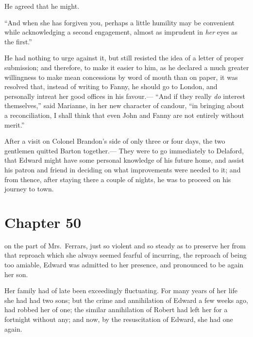 He agreed that he might.

``And when she has forgiven you, perhaps a little humility
may be convenient while acknowledging a second engagement,
almost as imprudent in \emph{her} eyes as the first.''

He had nothing to urge against it, but still
resisted the idea of a letter of proper submission;
and therefore, to make it easier to him, as he declared
a much greater willingness to make mean concessions
by word of mouth than on paper, it was resolved that,
instead of writing to Fanny, he should go to London,
and personally intreat her good offices in his favour.---%
``And if they really \emph{do} interest themselves,'' said Marianne,
in her new character of candour, ``in bringing about
a reconciliation, I shall think that even John and Fanny
are not entirely without merit.''

After a visit on Colonel Brandon's side of only three
or four days, the two gentlemen quitted Barton together.---%
They were to go immediately to Delaford, that Edward
might have some personal knowledge of his future home,
and assist his patron and friend in deciding on what
improvements were needed to it; and from thence,
after staying there a couple of nights, he was to proceed
on his journey to town.



\chapter{Chapter 50}


 on the part of Mrs.\ Ferrars,
just so violent and so steady as to preserve her from that
reproach which she always seemed fearful of incurring,
the reproach of being too amiable, Edward was admitted
to her presence, and pronounced to be again her son.

Her family had of late been exceedingly fluctuating.
For many years of her life she had had two sons;
but the crime and annihilation of Edward a few weeks ago,
had robbed her of one; the similar annihilation of Robert
had left her for a fortnight without any; and now,
by the resuscitation of Edward, she had one again.

